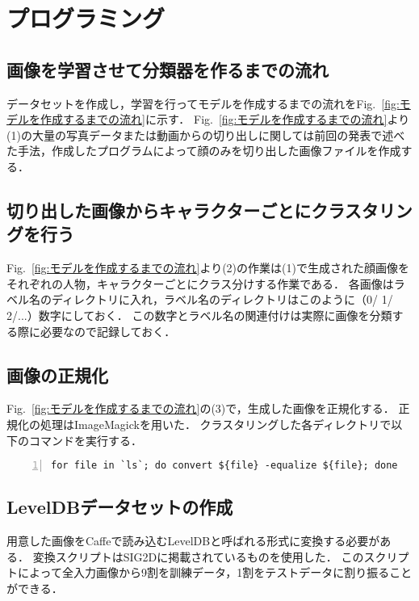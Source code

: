 \documentclass[a4paper,10pt]{jsarticle}
\begin{document}
\section{プログラミング}
\subsection{画像を学習させて分類器を作るまでの流れ}
データセットを作成し，学習を行ってモデルを作成するまでの流れをFig.~\ref{fig:モデルを作成するまでの流れ}に示す．
Fig.~\ref{fig:モデルを作成するまでの流れ}より(1)の大量の写真データまたは動画からの切り出しに関しては前回の発表で述べた手法，作成したプログラムによって顔のみを切り出した画像ファイルを作成する．

\subsection{切り出した画像からキャラクターごとにクラスタリングを行う}
Fig.~\ref{fig:モデルを作成するまでの流れ}より(2)の作業は(1)で生成された顔画像をそれぞれの人物，キャラクターごとにクラス分けする作業である．
各画像はラベル名のディレクトリに入れ，ラベル名のディレクトリはこのように（0/ 1/ 2/...）数字にしておく．
この数字とラベル名の関連付けは実際に画像を分類する際に必要なので記録しておく．

\subsection{画像の正規化}
Fig.~\ref{fig:モデルを作成するまでの流れ}の(3)で，生成した画像を正規化する．
正規化の処理はImageMagickを用いた．
クラスタリングした各ディレクトリで以下のコマンドを実行する．

\begin{lstlisting}[basicstyle=\ttfamily\footnotesize, frame=single, firstnumber=1, numbers=left, breaklines=true]
for file in `ls`; do convert ${file} -equalize ${file}; done
\end{lstlisting}

\subsection{LevelDBデータセットの作成}
用意した画像をCaffeで読み込むLevelDBと呼ばれる形式に変換する必要がある．
変換スクリプトはSIG2D\cite{SIG2D}に掲載されているものを使用した．
このスクリプトによって全入力画像から9割を訓練データ，1割をテストデータに割り振ることができる．
\end{document}
